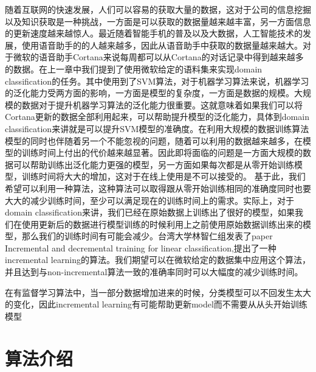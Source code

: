 \documentclass[master]{njuthesis}
\begin{document}
    随着互联网的快速发展，人们可以容易的获取大量的数据，这对于公司的信息挖掘以及知识获取是一种挑战，一方面是可以获取的数据量越来越丰富，另一方面信息的更新速度越来越惊人。最近随着智能手机的普及以及大数据，人工智能技术的发展，使用语音助手的的人越来越多，因此从语音助手中获取的数据量越来越大。对于微软的语音助手Cortana来说每周都可以从Cortana的对话记录中得到越来越多的数据。在上一章中我们提到了使用微软给定的语料集来实现domain classification的任务。其中使用到了SVM算法，对于机器学习算法来说，机器学习的泛化能力受两方面的影响，一方面是模型的复杂度，一方面是数据的规模。大规模的数据对于提升机器学习算法的泛化能力很重要。这就意味着如果我们可以将Cortana更新的数据全部利用起来，可以帮助提升模型的泛化能力，具体到domain classification来讲就是可以提升SVM模型的准确度。在利用大规模的数据训练算法模型的同时也伴随着另一个不能忽视的问题，随着可以利用的数据越来越多，在模型的训练时间上付出的代价越来越显著。因此即将面临的问题是一方面大规模的数据可以帮助训练出泛化能力更强的模型，另一方面如果每次都是从零开始训练模型，训练时间将大大的增加，这对于在线上使用是不可以接受的。
    基于此，我们希望可以利用一种算法，这种算法可以取得跟从零开始训练相同的准确度同时也要大大的减少训练时间，至少可以满足现在的训练时间上的需求。实际上，对于domain classification来讲，我们已经在原始数据上训练出了很好的模型，如果我们在使用更新后的数据进行模型训练的时候利用上之前使用原始数据训练出来的模型，那么我们的训练时间有可能会减少。台湾大学林智仁组发表了paper Incremental and decremental training for linear classification,提出了一种incremental learning的算法。我们期望可以在微软给定的数据集中应用这个算法，并且达到与non-incremental算法一致的准确率同时可以大幅度的减少训练时间。

在有监督学习算法中，当一部分数据增加进来的时候，分类模型可以不回发生太大的变化，因此incremental learning有可能帮助更新model而不需要从从头开始训练模型


\section{算法介绍}
\end{document}
